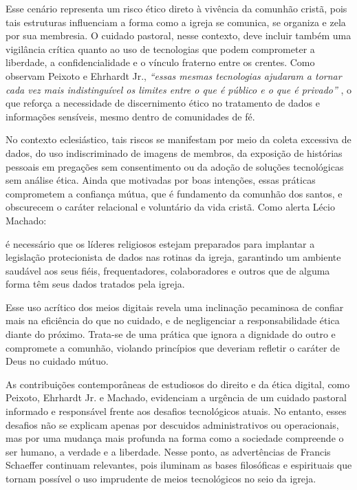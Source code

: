Esse cenário representa um risco ético direto à vivência da comunhão cristã, pois tais estruturas influenciam a forma como a igreja se comunica, se organiza e zela por sua membresia. O cuidado pastoral, nesse contexto, deve incluir também uma vigilância crítica quanto ao uso de tecnologias que podem comprometer a liberdade, a confidencialidade e o vínculo fraterno entre os crentes. Como observam Peixoto e Ehrhardt Jr., \textit{``essas mesmas tecnologias ajudaram a tornar cada vez mais indistinguível os limites entre o que é público e o que é privado''} \cite[p.~43]{peixoto2020ressignificacao}, o que reforça a necessidade de discernimento ético no tratamento de dados e informações sensíveis, mesmo dentro de comunidades de fé.

No contexto eclesiástico, tais riscos se manifestam por meio da coleta excessiva de dados, do uso indiscriminado de imagens de membros, da exposição de histórias pessoais em pregações sem consentimento ou da adoção de soluções tecnológicas sem análise ética. Ainda que motivadas por boas intenções, essas práticas comprometem a confiança mútua, que é fundamento da comunhão dos santos, e obscurecem o caráter relacional e voluntário da vida cristã. Como alerta Lécio Machado:
\begin{citacao}
    é necessário que os líderes religiosos estejam preparados para implantar a legislação protecionista de dados nas rotinas da igreja, garantindo um ambiente saudável aos seus fiéis, frequentadores, colaboradores e outros que de alguma forma têm seus dados tratados pela igreja. \cite[p.~5]{machado2020}
\end{citacao}

Esse uso acrítico dos meios digitais revela uma inclinação pecaminosa de confiar mais na eficiência do que no cuidado, e de negligenciar a responsabilidade ética diante do próximo. Trata-se de uma prática que ignora a dignidade do outro e compromete a comunhão, violando princípios que deveriam refletir o caráter de Deus no cuidado mútuo.

As contribuições contemporâneas de estudiosos do direito e da ética digital, como Peixoto, Ehrhardt Jr. e Machado, evidenciam a urgência de um cuidado pastoral informado e responsável frente aos desafios tecnológicos atuais. No entanto, esses desafios não se explicam apenas por descuidos administrativos ou operacionais, mas por uma mudança mais profunda na forma como a sociedade compreende o ser humano, a verdade e a liberdade. Nesse ponto, as advertências de Francis Schaeffer continuam relevantes, pois iluminam as bases filosóficas e espirituais que tornam possível o uso imprudente de meios tecnológicos no seio da igreja.

